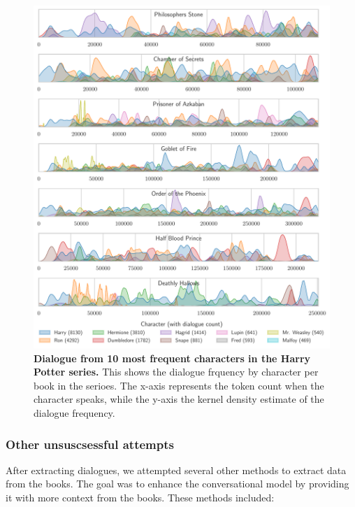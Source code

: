 \documentclass[fleqn,moreauthors,10pt]{ds_report}
\begin{document}
\begin{figure}[H]

	\centering
	\includegraphics[width=\linewidth]{hp_dialogue.pdf}
	\caption{\textbf{Dialogue from 10 most frequent characters in the Harry Potter series.} This shows the dialogue frquency by character per book in the serioes. The x-axis represents the token count when the character speaks, while the y-axis the kernel density estimate of the dialogue frequency.}
	\label{fig:hp_dialogue}
\end{figure}




\subsubsection*{Other unsuscsessful attempts}

After extracting dialogues, we attempted several other methods to extract data from the books. The goal was to enhance the conversational model by providing it with more context from the books. These methods included:
\end{document}
